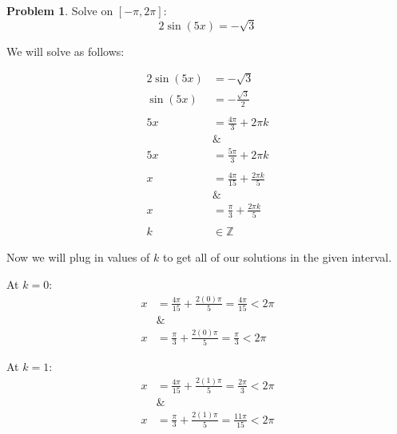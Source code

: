 \documentclass[12pt]{article}
\theoremstyle{definition}
\newtheorem{problem}{Problem}
\begin{document}
\begin{problem}
Solve on $\displaystyle [-\pi, 2\pi]$:
\begin{equation*}
    2\sin(5x) = -\sqrt{3} \label{eq:3}
\end{equation*}
\end{problem}

We will solve as follows:

\begin{align}
    2\sin(5x) & = -\sqrt{3}                          \\
    \sin(5x)  & = -\frac{\sqrt{3}}{2}                \\
    \nonumber                                        \\
    5x        & = \frac{4\pi}{3} + 2\pi k            \\
              & \&                                   \\
    5x        & = \frac{5\pi}{3} + 2\pi k            \\
    \nonumber                                        \\
    x         & = \frac{4\pi}{15} + \frac{2\pi k}{5} \\
              & \&                                   \\
    x         & = \frac{\pi}{3} + \frac{2\pi k}{5}   \\
    \nonumber                                        \\
    k         & \in \mathbb{Z}
\end{align}

Now we will plug in values of $k$ to get all of our solutions in the given interval.

At $k=0$:
\begin{align}
    x & =\frac{4\pi}{15} + \frac{2(0)\pi}{5} = \frac{4\pi}{15} < 2\pi \\
      & \&                                                            \\
    x & =\frac{\pi}{3} + \frac{2(0)\pi}{5} = \frac{\pi}{3} < 2\pi
\end{align}

At $k=1$:
\begin{align}
    x & =\frac{4\pi}{15} + \frac{2(1)\pi}{5} = \frac{2\pi}{3} < 2\pi \\
      & \&                                                           \\
    x & =\frac{\pi}{3} + \frac{2(1)\pi}{5} = \frac{11\pi}{15} < 2\pi
\end{align}
\end{document}
